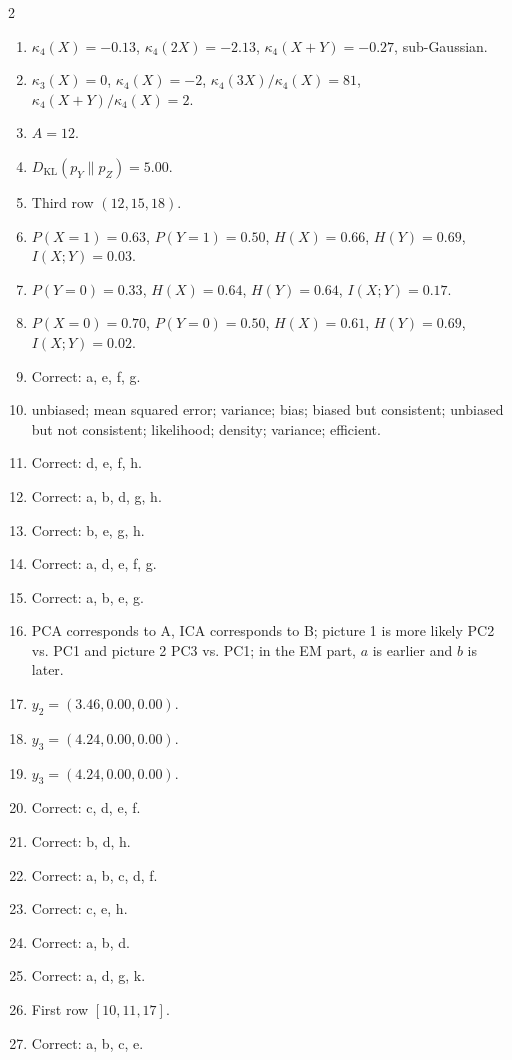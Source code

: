 \documentclass[11pt,oneside]{article}
\begin{document}
\begin{keybox}
\footnotesize
\begin{multicols}{2}
\begin{enumerate}[leftmargin=*,label=\textbf{Q\arabic*.}]
  \item $\kappa_4(X)=-0.13$, $\kappa_4(2X)=-2.13$, $\kappa_4(X+Y)=-0.27$, sub-Gaussian.
  \item $\kappa_3(X)=0$, $\kappa_4(X)=-2$, $\kappa_4(3X)/\kappa_4(X)=81$, $\kappa_4(X+Y)/\kappa_4(X)=2$.
  \item $A=12$.
  \item $D_{\mathrm{KL}}(p_Y\|p_Z)=5.00$.
  \item Third row $(12,15,18)$.
  \item $P(X=1)=0.63$, $P(Y=1)=0.50$, $H(X)=0.66$, $H(Y)=0.69$, $I(X;Y)=0.03$.
  \item $P(Y=0)=0.33$, $H(X)=0.64$, $H(Y)=0.64$, $I(X;Y)=0.17$.
  \item $P(X=0)=0.70$, $P(Y=0)=0.50$, $H(X)=0.61$, $H(Y)=0.69$, $I(X;Y)=0.02$.
  \item Correct: a, e, f, g.
  \item unbiased; mean squared error; variance; bias; biased but consistent; unbiased but not consistent; likelihood; density; variance; efficient.
  \item Correct: d, e, f, h.
  \item Correct: a, b, d, g, h.
  \item Correct: b, e, g, h.
  \item Correct: a, d, e, f, g.
  \item Correct: a, b, e, g.
  \item PCA corresponds to A, ICA corresponds to B; picture 1 is more likely PC2 vs. PC1 and picture 2 PC3 vs. PC1; in the EM part, $a$ is earlier and $b$ is later.
  \item $y_2=(3.46,0.00,0.00)$.
  \item $y_3=(4.24,0.00,0.00)$.
  \item $y_3=(4.24,0.00,0.00)$.
  \item Correct: c, d, e, f.
  \item Correct: b, d, h.
  \item Correct: a, b, c, d, f.
  \item Correct: c, e, h.
  \item Correct: a, b, d.
  \item Correct: a, d, g, k.
  \item First row $[10,11,17]$.
  \item Correct: a, b, c, e.

\end{enumerate}
\end{multicols}
\end{keybox}
\end{document}
